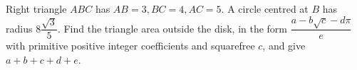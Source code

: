 Right triangle $ABC$ has $AB=3,BC=4,AC=5$. A circle centred at $B$ has radius $8\dfrac{\sqrt3}{5}$. Find the triangle area outside the disk, in the form $\dfrac{a-b\sqrt c-d\pi}{e}$ with primitive positive integer coefficients and squarefree $c$, and give $a+b+c+d+e$.
